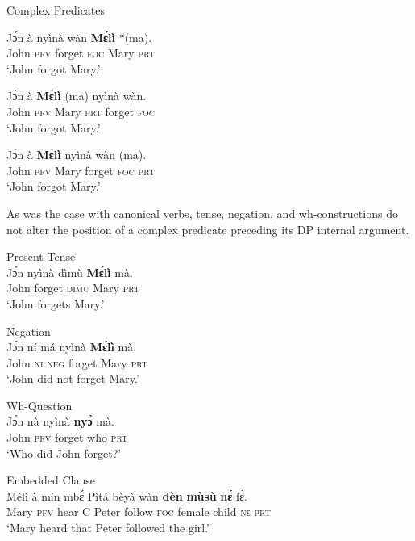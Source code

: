 \documentclass[output=paper,colorlinks,citecolor=brown,draftmode
]{langscibook}
\begin{document}
\ea \label{ex:Kono: nyina VO}
Complex Predicates
\begin{xlist}

\ex \label{ex:Kono:forget}
\gll Jɔ́n à nyìnà wàn \textbf{Mɛ́lì} *(ma).  \\
John \textsc{pfv} forget \textsc{foc} Mary \textsc{prt} \\
\glt `John forgot Mary.'

\ex \label{ex:Kono:forgetUG}
\gll *Jɔ́n à \textbf{Mɛ́lì} (ma) nyìnà wàn.   \\
John \textsc{pfv} Mary \textsc{prt} forget \textsc{foc}  \\
\glt `John forgot Mary.'

\ex \label{ex:Kono:forgetUGPS}
\gll *Jɔ́n à \textbf{Mɛ́lì} nyìnà wàn  (ma).  \\
John \textsc{pfv} Mary forget \textsc{foc}  \textsc{prt} \\
\glt `John forgot Mary.'

\end{xlist}
\z 


As was the case with canonical verbs, tense, negation, and wh-constructions do not alter the position of a complex predicate preceding its DP internal argument. 


\ea \label{ex:Kono: Consistent VO}
\begin{xlist}

\ex \label{ex:Kono:Complex: Present}
Present Tense \\
\gll Jɔ́n nyìnà dìmù \textbf{Mɛ́lì} mà. \\
John forget \textsc{dimu} Mary \textsc{prt} \\
\glt `John forgets Mary.'

\ex \label{ex:Kono:Complex: Negation}
Negation \\
\gll Jɔ́n ní má nyìnà \textbf{Mɛ́lì} mà.    \\
John \textsc{ni} \textsc{neg} forget Mary \textsc{prt} \\
\glt `John did not forget Mary.'

\newpage
\ex \label{ex:Kono:Complex: WH}
Wh-Question \\
\gll Jɔ́n nà nyìnà \textbf{nyɔ̀} mà.  \\
John \textsc{pfv} forget who \textsc{prt} \\
\glt `Who did John forget?'

\ex \label{ex:Kono:Complex: Embedded}
Embedded Clause \\
\gll Mélì à mín mbɛ́ Pìtá bèyà wàn \textbf{dèn} \textbf{mùsù} \textbf{nɛ́} fɛ̀.	  \\
Mary \textsc{pfv} hear \textsc{C} Peter follow \textsc{foc} female child \textsc{nɛ} \textsc{prt} \\
\glt `Mary heard that Peter followed the girl.'

\end{xlist}
\z 
\end{document}
